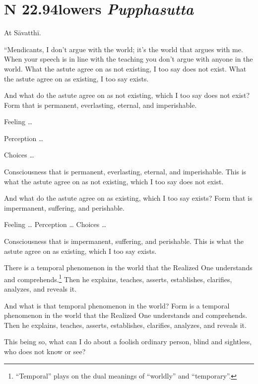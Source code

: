 \documentclass[12pt,openany]{book}%
\newcommand*{\suttatitleacronym}[1]{\smaller[2]{#1}\vspace*{.3em}}
\newcommand*{\suttatitletranslation}[1]{\linebreak{#1}}
\newcommand*{\suttatitleroot}[1]{\linebreak\smaller[2]\itshape{#1}}
\newcommand*{\tocacronym}[1]{\hspace*{-3.3em}{#1}\quad}
\newcommand*{\toctranslation}[1]{#1}
\newcommand*{\tocroot}[1]{(\textit{#1})}
\begin{document}
%
\section*{{\suttatitleacronym SN 22.94}{\suttatitletranslation Flowers }{\suttatitleroot Pupphasutta}}
\addcontentsline{toc}{section}{\tocacronym{SN 22.94} \toctranslation{Flowers } \tocroot{Pupphasutta}}

At \textsanskrit{Sāvatthī}. 

“Mendicants, I don’t argue with the world; it’s the world that argues with me. When your speech is in line with the teaching you don’t argue with anyone in the world. What the astute agree on as not existing, I too say does not exist. What the astute agree on as existing, I too say exists. 

And what do the astute agree on as not existing, which I too say does not exist? Form that is permanent, everlasting, eternal, and imperishable. 

Feeling … 

Perception … 

Choices … 

Consciousness that is permanent, everlasting, eternal, and imperishable. This is what the astute agree on as not existing, which I too say does not exist. 

And what do the astute agree on as existing, which I too say exists? Form that is impermanent, suffering, and perishable. 

Feeling … Perception … Choices … 

Consciousness that is impermanent, suffering, and perishable. This is what the astute agree on as existing, which I too say exists. 

There is a temporal phenomenon in the world that the Realized One understands and comprehends.\footnote{“Temporal” plays on the dual meanings of “worldly” and “temporary”. } Then he explains, teaches, asserts, establishes, clarifies, analyzes, and reveals it. 

And what is that temporal phenomenon in the world? Form is a temporal phenomenon in the world that the Realized One understands and comprehends. Then he explains, teaches, asserts, establishes, clarifies, analyzes, and reveals it. 

This being so, what can I do about a foolish ordinary person, blind and sightless, who does not know or see? 
\end{document}
